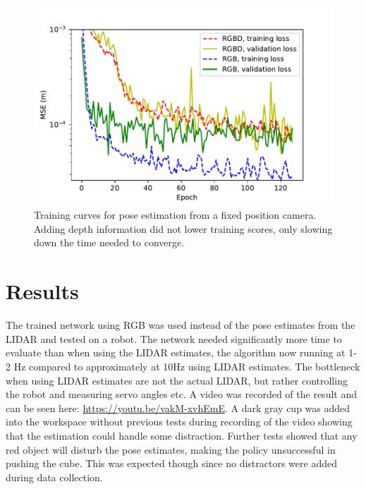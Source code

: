 \begin{figure}[h!]
    \centering
    \includegraphics[width=0.6 \textwidth]{res/depth-vs-rgb.pdf}

    \caption{Training curves for pose estimation from a fixed position camera.
    Adding depth information did not lower training scores, only slowing down
    the time needed to converge.}

    \label{fig:depth-vs-rgb}
    
\end{figure}

\section{Results}

The trained network using RGB was used instead of the pose estimates from the
LIDAR and tested on a robot. The network needed significantly more time to
evaluate than when using the LIDAR estimates, the algorithm now running at 1-2
Hz compared to approximately at 10Hz using LIDAR estimates. The bottleneck when
using LIDAR estimates are not the actual LIDAR, but rather controlling the
robot and measuring servo angles etc. A video was recorded of the result and
can be seen here: \url{https://youtu.be/vakM-xvhEmE}. A dark gray cup was added
into the workspace without previous tests during recording of the video showing
that the estimation could handle some distraction. Further tests showed that
any red object will disturb the pose estimates, making the policy unsuccessful
in pushing the cube. This was expected though since no distractors were added
during data collection.
